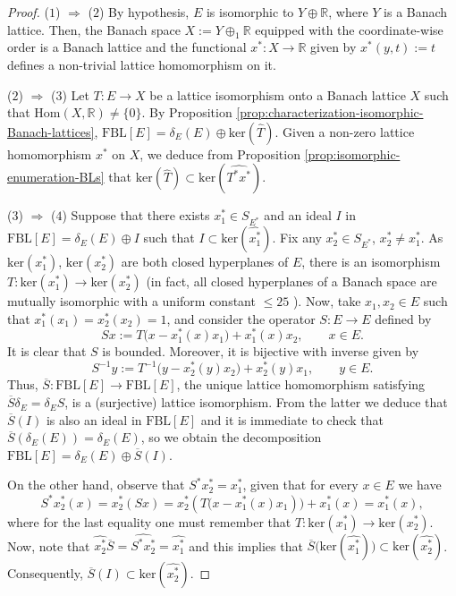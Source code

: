 \documentclass[11pt]{amsart}
\theoremstyle{definition}
\numberwithin{equation}{section}
\newcommand{\fbl}{\text{FBL}}
\begin{document}
\begin{proof}
($1$) $\Rightarrow$ ($2$)  By hypothesis, $E$ is isomorphic to $Y\oplus \mathbb{R}$, where $Y$ is a Banach lattice. Then, the Banach space $X:=Y\oplus_1\mathbb{R}$ equipped with the coordinate-wise order is a Banach lattice and the functional $x^*:X\to \mathbb{R}$ given by $x^*(y,t):=t$ defines a non-trivial lattice homomorphism on it.

\noindent ($2$) $\Rightarrow$ ($3$) Let $T:E\to X$ be a lattice isomorphism onto a Banach lattice $X$ such that $\text{Hom}(X,\mathbb{R})\neq \{0\}$. By Proposition \ref{prop:characterization-isomorphic-Banach-lattices}, $\fbl[E]=\delta_E(E)\oplus \text{ker}(\widehat{T})$. Given a non-zero lattice homomorphism $x^*$ on $X$, we deduce from Proposition \ref{prop:isomorphic-enumeration-BLs} that $\text{ker}(\widehat{T})\subset \text{ker}(\widehat{T^*x^*})$.

\noindent ($3$) $\Rightarrow$ ($4$) Suppose that there exists $x_1^*\in S_{E^*}$ and an ideal $I$ in $\fbl[E]=\delta_E(E)\oplus I$ such that $I\subset \text{ker}(\widehat{x_1^*})$. Fix any $x_2^*\in S_{E^*}$, $x_2^*\neq x_1^*$. As $\text{ker}(x_1^*)$, $\text{ker}(x_2^*)$ are both closed hyperplanes of $E$, there is an isomorphism $T:\text{ker}(x_1^*)\to \text{ker}(x_2^*)$ \cite[Exercise 2.7]{FHHMPZ-book} (in fact, all closed hyperplanes of a Banach space are mutually isomorphic with a uniform constant $\leq 25$ \cite[Lemma 9.5.4]{AA-book}). Now, take $x_1,x_2\in E$ such that $x_1^*(x_1)=x_2^*(x_2)=1$, and consider the operator $S:E\to E$ defined by
$$
Sx:=T\bigl(x-x_1^*(x)x_1\bigr)+x_1^*(x)x_2, \qquad x\in E.
$$
It is clear that $S$ is bounded. Moreover, it is bijective with inverse given by
$$
S^{-1}y:=T^{-1}\bigl(y-x_2^*(y)x_2\bigr)+x_2^*(y)x_1, \qquad y\in E.
$$
Thus, $\overline{S}:\fbl[E]\to \fbl[E]$, the unique lattice homomorphism satisfying $\overline{S}\delta_E=\delta_ES$, is a (surjective) lattice isomorphism. From the latter we deduce that $\overline{S}(I)$ is also an ideal in $\fbl[E]$ and it is immediate to check that $\overline{S}(\delta_E(E))=\delta_E(E)$, so we obtain the decomposition $\fbl[E]=\delta_E(E)\oplus \overline{S}(I)$. 

On the other hand, observe that $S^*x_2^*=x_1^*$, given that for every $x\in E$ we have
$$
S^*x_2^*(x)=x_2^*(Sx)=x_2^*\left(T\bigl(x-x_1^*(x)x_1\right)\bigr)+x_1^*(x)=x_1^*(x),
$$
where for the last equality one must remember that $T:\text{ker}(x_1^*)\to\text{ker}(x_2^*)$. Now, note that $\widehat{x_2^*}\overline{S}=\widehat{S^*x_2^*}=\widehat{x_1^*}$ and this implies that $\overline{S}\bigl(\text{ker}(\widehat{x_1^*})\bigr)\subset \text{ker}(\widehat{x_2^*})$. Consequently, $\overline{S}(I)\subset \text{ker}(\widehat{x_2^*})$.


\end{proof}
\end{document}
